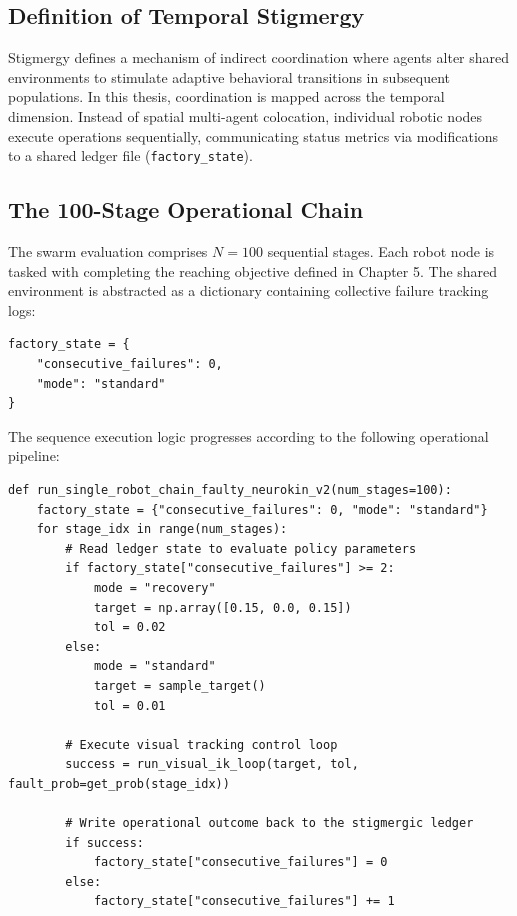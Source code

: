 \documentclass[12pt,a4paper,oneside]{report}
\begin{document}
\subsection{Definition of Temporal Stigmergy}
Stigmergy defines a mechanism of indirect coordination where agents alter shared environments to stimulate adaptive behavioral transitions in subsequent populations. In this thesis, coordination is mapped across the temporal dimension. Instead of spatial multi-agent colocation, individual robotic nodes execute operations sequentially, communicating status metrics via modifications to a shared ledger file (\texttt{factory\_state}).

\subsection{The 100-Stage Operational Chain}
The swarm evaluation comprises $N = 100$ sequential stages. Each robot node is tasked with completing the reaching objective defined in Chapter 5. The shared environment is abstracted as a dictionary containing collective failure tracking logs:
\begin{verbatim}
factory_state = {
    "consecutive_failures": 0,
    "mode": "standard"
}
\end{verbatim}

The sequence execution logic progresses according to the following operational pipeline:
\begin{minipage}{\linewidth}
\begin{verbatim}
def run_single_robot_chain_faulty_neurokin_v2(num_stages=100):
    factory_state = {"consecutive_failures": 0, "mode": "standard"}
    for stage_idx in range(num_stages):
        # Read ledger state to evaluate policy parameters
        if factory_state["consecutive_failures"] >= 2:
            mode = "recovery"
            target = np.array([0.15, 0.0, 0.15])
            tol = 0.02
        else:
            mode = "standard"
            target = sample_target()
            tol = 0.01
            
        # Execute visual tracking control loop
        success = run_visual_ik_loop(target, tol, fault_prob=get_prob(stage_idx))
        
        # Write operational outcome back to the stigmergic ledger
        if success:
            factory_state["consecutive_failures"] = 0
        else:
            factory_state["consecutive_failures"] += 1
\end{verbatim}
\end{minipage}
\end{document}
